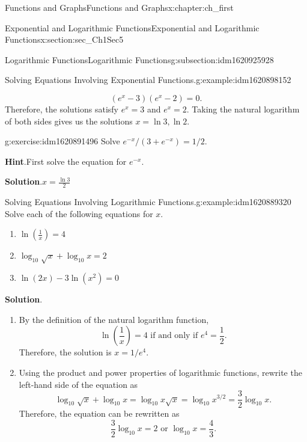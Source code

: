 \documentclass[oneside,10pt,]{book}
\newcommand{\blocktitlefont}{\relax}
\numberwithin{equation}{section}
\begin{document}
\begin{chapterptx}{Functions and Graphs}{}{Functions and Graphs}{}{}{x:chapter:ch_first}
\begin{sectionptx}{Exponential and Logarithmic Functions}{}{Exponential and Logarithmic Functions}{}{}{x:section:sec_Ch1Sec5}
\begin{subsectionptx}{Logarithmic Functions}{}{Logarithmic Functions}{}{}{g:subsection:idm1620925928}
\begin{example}{Solving Equations Involving Exponential Functions.}{g:example:idm1620898152}
\begin{enumerate}
\begin{equation*}
(e^x-3)(e^x-2)=0.
\end{equation*}
Therefore, the solutions satisfy \(e^x=3\) and \(e^x=2.\) Taking the natural logarithm of both sides gives us the solutions \(x=\ln 3,\ln 2.\)%
\end{enumerate}
\end{example}
\begin{inlineexercise}{}{g:exercise:idm1620891496}%
Solve \(e^{-x}/(3+e^{-x})=1/2.\)%
\par\smallskip%
\noindent\textbf{\blocktitlefont Hint}.\hypertarget{g:hint:idm1620892136}{}\quad{}First solve the equation for \(e^{-x}.\)%
\par\smallskip%
\noindent\textbf{\blocktitlefont Solution}.\hypertarget{g:solution:idm1620890472}{}\quad{}\(x=\frac{\ln 3}{2}\)%
\end{inlineexercise}%
\begin{example}{Solving Equations Involving Logarithmic Functions.}{g:example:idm1620889320}%
Solve each of the following equations for \(x.\)%
%
\begin{enumerate}
\item{}\(\displaystyle \ln\left(\frac{1}{x}\right)=4\)%
\item{}\(\displaystyle \log_{10}\sqrt{x}+\log_{10}x=2\)%
\item{}\(\displaystyle \ln(2x)-3\ln(x^2)=0\)%
\end{enumerate}
\par\smallskip%
\noindent\textbf{\blocktitlefont Solution}.\hypertarget{g:solution:idm1620884584}{}\quad{}%
\begin{enumerate}
\item{}By the definition of the natural logarithm function,%
\begin{equation*}
\ln\left(\frac{1}{x}\right)=4 \text{ if and only if } e^4=\frac{1}{2}.
\end{equation*}
Therefore, the solution is \(x=1/e^4.\)%
\item{}Using the product and power properties of logarithmic functions, rewrite the left-hand side of the equation as%
\begin{equation*}
\log_{10}\sqrt{x}+\log_{10}x=\log_{10}x\sqrt{x}=\log_{10}x^{3/2}=\frac{3}{2}\log_{10}x.
\end{equation*}
Therefore, the equation can be rewritten as%
\begin{equation*}
\frac{3}{2}\log_{10}x=2 \text{ or } \log_{10}x=\frac{4}{3}.
\end{equation*}

\end{enumerate}
\end{example}
\end{subsectionptx}
\end{sectionptx}
\end{chapterptx}
\end{document}
